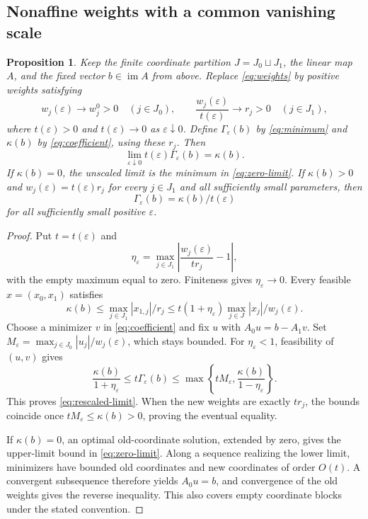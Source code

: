 \documentclass[11pt,a4paper]{article}
\numberwithin{equation}{section}
\newtheorem{proposition}[theorem]{Proposition}
\theoremstyle{remark}
\newcommand{\im}{\operatorname{im}}
\begin{document}
\subsection{Nonaffine weights with a common vanishing scale}
\begin{proposition}\label{prop:common-scale}
Keep the finite coordinate partition $J=J_0\sqcup J_1$, the linear map $A$, and the fixed vector $b\in\im A$ from above. Replace \eqref{eq:weights} by positive weights satisfying
\begin{equation}\label{eq:common-scale}
 w_j(\varepsilon)\longrightarrow w_j^0>0\quad(j\in J_0),\qquad
 \frac{w_j(\varepsilon)}{t(\varepsilon)}\longrightarrow r_j>0\quad(j\in J_1),
\end{equation}
where $t(\varepsilon)>0$ and $t(\varepsilon)\to0$ as $\varepsilon\downarrow0$. Define $\Gamma_\varepsilon(b)$ by \eqref{eq:minimum} and $\kappa(b)$ by \eqref{eq:coefficient}, using these $r_j$. Then
\begin{equation}\label{eq:rescaled-limit}
 \lim_{\varepsilon\downarrow0}t(\varepsilon)\Gamma_\varepsilon(b)=\kappa(b).
\end{equation}
If $\kappa(b)=0$, the unscaled limit is the minimum in \eqref{eq:zero-limit}. If $\kappa(b)>0$ and $w_j(\varepsilon)=t(\varepsilon)r_j$ for every $j\in J_1$ and all sufficiently small parameters, then
\[
 \Gamma_\varepsilon(b)=\kappa(b)/t(\varepsilon)
\]
for all sufficiently small positive $\varepsilon$.
\end{proposition}
\begin{proof}
Put $t=t(\varepsilon)$ and
\[
 \eta_\varepsilon=\max_{j\in J_1}
 \left|\frac{w_j(\varepsilon)}{t r_j}-1\right|,
\]
with the empty maximum equal to zero. Finiteness gives $\eta_\varepsilon\to0$. Every feasible $x=(x_0,x_1)$ satisfies
\[
 \kappa(b)\le\max_{j\in J_1}|x_{1,j}|/r_j
 \le t(1+\eta_\varepsilon)\max_{j\in J}|x_j|/w_j(\varepsilon).
\]
Choose a minimizer $v$ in \eqref{eq:coefficient} and fix $u$ with $A_0u=b-A_1v$. Set $M_\varepsilon=\max_{j\in J_0}|u_j|/w_j(\varepsilon)$, which stays bounded. For $\eta_\varepsilon<1$, feasibility of $(u,v)$ gives
\[
 \frac{\kappa(b)}{1+\eta_\varepsilon}
 \le t\Gamma_\varepsilon(b)
 \le\max\left\{tM_\varepsilon,\frac{\kappa(b)}{1-\eta_\varepsilon}\right\}.
\]
This proves \eqref{eq:rescaled-limit}. When the new weights are exactly $tr_j$, the bounds coincide once $tM_\varepsilon\le\kappa(b)>0$, proving the eventual equality.

If $\kappa(b)=0$, an optimal old-coordinate solution, extended by zero, gives the upper-limit bound in \eqref{eq:zero-limit}. Along a sequence realizing the lower limit, minimizers have bounded old coordinates and new coordinates of order $O(t)$. A convergent subsequence therefore yields $A_0u=b$, and convergence of the old weights gives the reverse inequality. This also covers empty coordinate blocks under the stated convention.
\end{proof}
\end{document}
